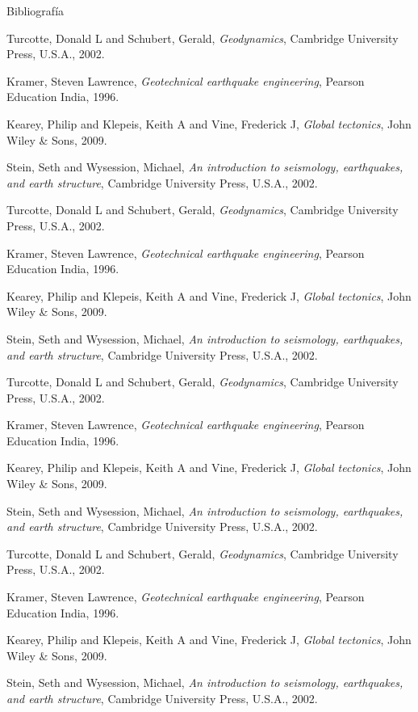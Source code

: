 \documentclass[aspectratio=169]{beamer}
\begin{document}
\begin{frame}[allowframebreaks]{Bibliografía}
    
\begin{thebibliography}{20}

 Turcotte, Donald L and Schubert, Gerald, \textit{Geodynamics}, Cambridge University Press, U.S.A., 2002.

 Kramer, Steven Lawrence, \textit{Geotechnical earthquake engineering}, Pearson Education India, 1996.


 Kearey, Philip and Klepeis, Keith A and Vine, Frederick J, \textit{Global tectonics}, John Wiley \& Sons, 2009.

 Stein, Seth and Wysession, Michael, \textit{An introduction to seismology, earthquakes, and earth structure}, Cambridge University Press, U.S.A., 2002.

 Turcotte, Donald L and Schubert, Gerald, \textit{Geodynamics}, Cambridge University Press, U.S.A., 2002.

 Kramer, Steven Lawrence, \textit{Geotechnical earthquake engineering}, Pearson Education India, 1996.


 Kearey, Philip and Klepeis, Keith A and Vine, Frederick J, \textit{Global tectonics}, John Wiley \& Sons, 2009.

 Stein, Seth and Wysession, Michael, \textit{An introduction to seismology, earthquakes, and earth structure}, Cambridge University Press, U.S.A., 2002.

 Turcotte, Donald L and Schubert, Gerald, \textit{Geodynamics}, Cambridge University Press, U.S.A., 2002.

 Kramer, Steven Lawrence, \textit{Geotechnical earthquake engineering}, Pearson Education India, 1996.


 Kearey, Philip and Klepeis, Keith A and Vine, Frederick J, \textit{Global tectonics}, John Wiley \& Sons, 2009.

 Stein, Seth and Wysession, Michael, \textit{An introduction to seismology, earthquakes, and earth structure}, Cambridge University Press, U.S.A., 2002.

 Turcotte, Donald L and Schubert, Gerald, \textit{Geodynamics}, Cambridge University Press, U.S.A., 2002.

 Kramer, Steven Lawrence, \textit{Geotechnical earthquake engineering}, Pearson Education India, 1996.


 Kearey, Philip and Klepeis, Keith A and Vine, Frederick J, \textit{Global tectonics}, John Wiley \& Sons, 2009.

 Stein, Seth and Wysession, Michael, \textit{An introduction to seismology, earthquakes, and earth structure}, Cambridge University Press, U.S.A., 2002.

\end{thebibliography}
\end{frame}
\end{document}
